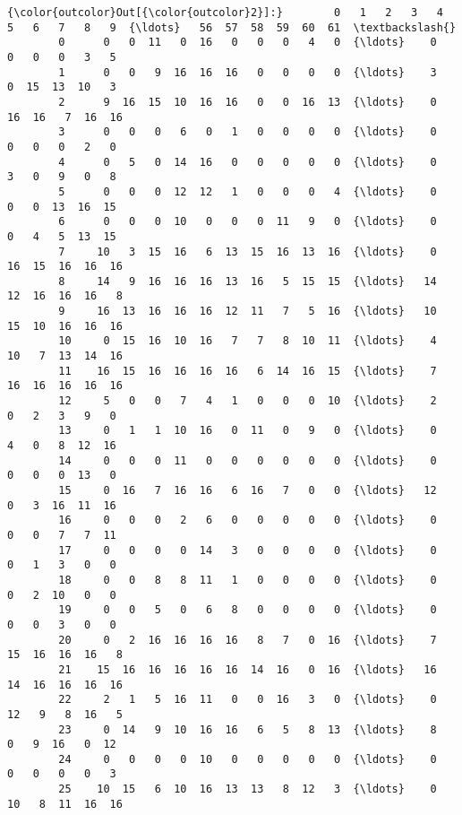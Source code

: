 \documentclass[11pt]{article}
\begin{document}
\begin{Verbatim}[commandchars=\\\{\}]
{\color{outcolor}Out[{\color{outcolor}2}]:}        0   1   2   3   4   5   6   7   8   9  {\ldots}   56  57  58  59  60  61  \textbackslash{}
        0      0   0  11   0  16   0   0   0   4   0  {\ldots}    0   0   0   0   3   5   
        1      0   0   9  16  16  16   0   0   0   0  {\ldots}    3   0  15  13  10   3   
        2      9  16  15  10  16  16   0   0  16  13  {\ldots}    0  16  16   7  16  16   
        3      0   0   0   6   0   1   0   0   0   0  {\ldots}    0   0   0   0   2   0   
        4      0   5   0  14  16   0   0   0   0   0  {\ldots}    0   3   0   9   0   8   
        5      0   0   0  12  12   1   0   0   0   4  {\ldots}    0   0   0  13  16  15   
        6      0   0   0  10   0   0   0  11   9   0  {\ldots}    0   0   4   5  13  15   
        7     10   3  15  16   6  13  15  16  13  16  {\ldots}    0  16  15  16  16  16   
        8     14   9  16  16  16  13  16   5  15  15  {\ldots}   14  12  16  16  16   8   
        9     16  13  16  16  16  12  11   7   5  16  {\ldots}   10  15  10  16  16  16   
        10     0  15  16  10  16   7   7   8  10  11  {\ldots}    4  10   7  13  14  16   
        11    16  15  16  16  16  16   6  14  16  15  {\ldots}    7  16  16  16  16  16   
        12     5   0   0   7   4   1   0   0   0  10  {\ldots}    2   0   2   3   9   0   
        13     0   1   1  10  16   0  11   0   9   0  {\ldots}    0   4   0   8  12  16   
        14     0   0   0  11   0   0   0   0   0   0  {\ldots}    0   0   0   0  13   0   
        15     0  16   7  16  16   6  16   7   0   0  {\ldots}   12   0   3  16  11  16   
        16     0   0   0   2   6   0   0   0   0   0  {\ldots}    0   0   0   7   7  11   
        17     0   0   0   0  14   3   0   0   0   0  {\ldots}    0   0   1   3   0   0   
        18     0   0   8   8  11   1   0   0   0   0  {\ldots}    0   0   2  10   0   0   
        19     0   0   5   0   6   8   0   0   0   0  {\ldots}    0   0   0   3   0   0   
        20     0   2  16  16  16  16   8   7   0  16  {\ldots}    7  15  16  16  16   8   
        21    15  16  16  16  16  16  14  16   0  16  {\ldots}   16  14  16  16  16  16   
        22     2   1   5  16  11   0   0  16   3   0  {\ldots}    0  12   9   8  16   5   
        23     0  14   9  10  16  16   6   5   8  13  {\ldots}    8   0   9  16   0  12   
        24     0   0   0   0  10   0   0   0   0   0  {\ldots}    0   0   0   0   0   3   
        25    10  15   6  10  16  13  13   8  12   3  {\ldots}    0  10   8  11  16  16   

\end{Verbatim}
\end{document}
